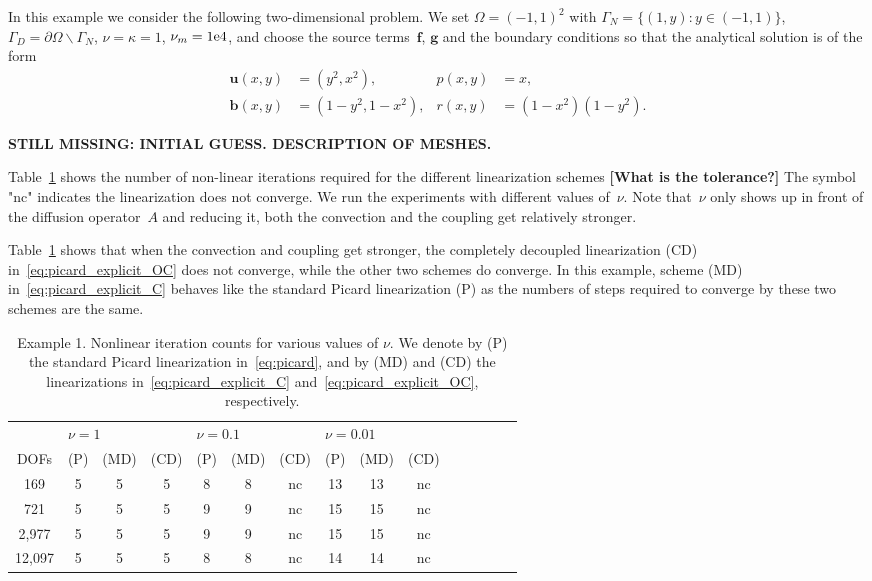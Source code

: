 \documentclass{siamltex}
\newcommand{\uu}[1]{\boldsymbol #1}                     %
\begin{document}
In this example we consider the following two-dimensional problem. We set $\Omega =
(-1, 1)^2$ with $\Gamma_N = \{(1, y) : y\in (-1, 1)\}$, $\Gamma_D =
\partial \Omega \backslash \Gamma_N$, $\nu = \kappa =1$, $\nu_m
=\rm{1e4}$, and choose the source terms~$\uu{f}$, $\uu{g}$ and the
boundary conditions so that the analytical solution is of the form
\begin{align*}
\uu{u}(x,y)& =(y^2, x^2),&
p(x,y)& =x,\\[0.1cm]
\uu{b}(x,y)& =(1-y^2, 1-x^2),& r(x,y)& =(1-x^2)(1-y^2).
\end{align*}

{\bf STILL MISSING: INITIAL GUESS. DESCRIPTION OF MESHES.}

Table~\ref{tab:smooth_picard} shows the number of non-linear iterations required for the different linearization schemes {\bf [What is the tolerance?]}
The symbol "nc" indicates the linearization does not converge. We run the experiments with different values of~$\nu$. Note that~$\nu$ only shows up in front of the diffusion operator~$A$ and reducing it, both the convection and the coupling get relatively stronger.

Table~\ref{tab:smooth_picard} shows that when the convection and coupling get stronger, the completely decoupled linearization (CD) in~\eqref{eq:picard_explicit_OC} does not converge, while the other two schemes do converge. In this example,
scheme (MD) in~\eqref{eq:picard_explicit_C} behaves like the standard Picard linearization (P) as the numbers of steps required to converge by these two schemes are the same.

\begin{table}[!ht]
\begin{center}
\begin{tabular}{ccccccccccccccc}
\hline
&\multicolumn{3}{l}{$\nu = 1$} & \multicolumn{3}{l}{$\nu = 0.1$} & \multicolumn{3}{l}{$\nu = 0.01$} \\
  DOFs& (P) & (MD) & (CD) & (P) & (MD) & (CD) & (P) & (MD) & (CD)\\
\hline
169 & 5 & 5 & 5 & 8 & 8 & nc & 13 & 13 & nc \\
721 & 5 & 5 & 5 & 9 & 9 & nc & 15 & 15 & nc \\
2,977 & 5 & 5 & 5 & 9 & 9 & nc & 15 & 15 & nc \\
12,097 & 5 & 5 & 5 & 8 & 8 & nc & 14 & 14 & nc \\
\hline
\end{tabular}
\caption{Example 1. Nonlinear iteration counts for various values of $\nu$. We denote by (P) the standard Picard linearization in~\eqref{eq:picard}, and by (MD) and (CD) the linearizations in~\eqref{eq:picard_explicit_C} and~\eqref{eq:picard_explicit_OC}, respectively.}
\label{tab:smooth_picard}
\end{center}
\end{table}
\end{document}
